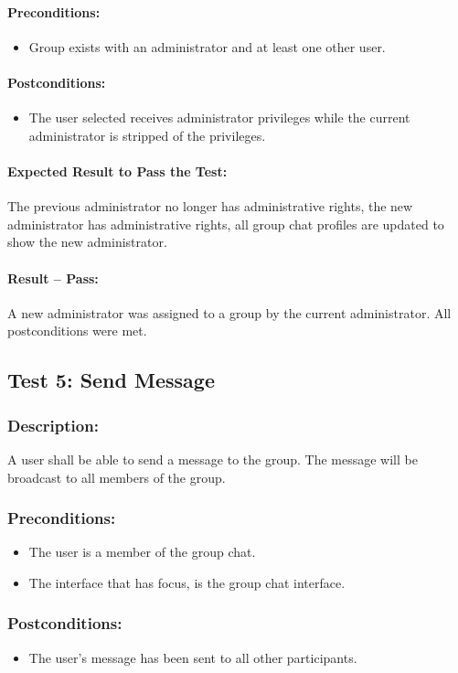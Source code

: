 \documentclass[11pt]{article}
\begin{document}
\paragraph{Preconditions:} 
\begin{itemize}
\item Group exists with an administrator and at least
one other user.
\end{itemize}
\paragraph{Postconditions:}
\begin{itemize}
\item The user selected receives administrator privileges while the current administrator is stripped of the privileges.
\end{itemize}
\paragraph{Expected Result to Pass the Test:}
The previous administrator no longer has administrative rights, the new administrator has administrative rights, all group chat profiles are updated to show the new administrator.
\paragraph{Result -- Pass:}
A new administrator was assigned to a group by the current administrator. All postconditions were met.

\subsection{Test 5: Send Message}
\subsubsection{Description:}
A user shall be able to send a message to the group.
The message will be broadcast to all members of the group.
\subsubsection{Preconditions:} 
\begin{itemize}
\item The user is a member of the group chat.
\item The interface that has focus, is the group chat interface.
\end{itemize}
\subsubsection{Postconditions:}
\begin{itemize}
\item The user's message has been sent to all other participants.
\end{itemize}
\end{document}
